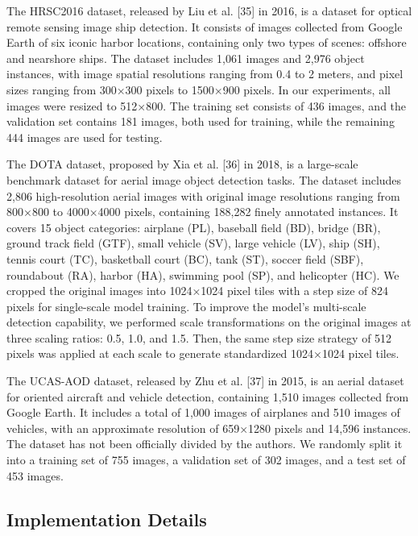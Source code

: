 \documentclass[journal]{IEEEtran}
\begin{document}
The HRSC2016 dataset, released by Liu et al. [35] in 2016, is a dataset for optical remote sensing image ship detection. It consists of images collected from Google Earth of six iconic harbor locations, containing only two types of scenes: offshore and nearshore ships. The dataset includes 1,061 images and 2,976 object instances, with image spatial resolutions ranging from 0.4 to 2 meters, and pixel sizes ranging from 300×300 pixels to 1500×900 pixels. In our experiments, all images were resized to 512×800. The training set consists of 436 images, and the validation set contains 181 images, both used for training, while the remaining 444 images are used for testing.

The DOTA dataset, proposed by Xia et al. [36] in 2018, is a large-scale benchmark dataset for aerial image object detection tasks. The dataset includes 2,806 high-resolution aerial images with original image resolutions ranging from 800×800 to 4000×4000 pixels, containing 188,282 finely annotated instances. It covers 15 object categories: airplane (PL), baseball field (BD), bridge (BR), ground track field (GTF), small vehicle (SV), large vehicle (LV), ship (SH), tennis court (TC), basketball court (BC), tank (ST), soccer field (SBF), roundabout (RA), harbor (HA), swimming pool (SP), and helicopter (HC). We cropped the original images into 1024×1024 pixel tiles with a step size of 824 pixels for single-scale model training. To improve the model's multi-scale detection capability, we performed scale transformations on the original images at three scaling ratios: 0.5, 1.0, and 1.5. Then, the same step size strategy of 512 pixels was applied at each scale to generate standardized 1024×1024 pixel tiles.

The UCAS-AOD dataset, released by Zhu et al. [37] in 2015, is an aerial dataset for oriented aircraft and vehicle detection, containing 1,510 images collected from Google Earth. It includes a total of 1,000 images of airplanes and 510 images of vehicles, with an approximate resolution of 659×1280 pixels and 14,596 instances. The dataset has not been officially divided by the authors. We randomly split it into a training set of 755 images, a validation set of 302 images, and a test set of 453 images.

\subsection{ Implementation Details }
\end{document}
